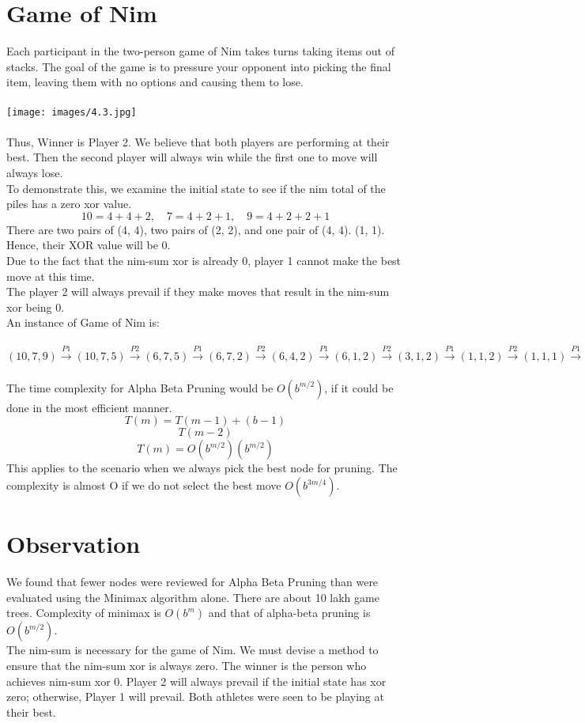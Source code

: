 \documentclass[conference]{IEEEtran}
\begin{document}
\section{Game of Nim}
Each participant in the two-person game of Nim takes turns taking items out of stacks. The goal of the game is to pressure your opponent into picking the final item, leaving them with no options and causing them to lose.\\ \\
\texttt{[image: images/4.3.jpg]} \\ \\
Thus, Winner is Player 2.
We believe that both players are performing at their best. Then the second player will always win while the first one to move will always lose.\\
To demonstrate this, we examine the initial state to see if the nim total of the piles has a zero xor value.\\
$$10 = 4 + 4 + 2, \quad 7 = 4 + 2 + 1, \quad 9 = 4 + 2 + 2 + 1$$
There are two pairs of (4, 4), two pairs of (2, 2), and one pair of (4, 4). (1, 1). Hence, their XOR value will be 0.\\
Due to the fact that the nim-sum xor is already 0, player 1 cannot make the best move at this time.\\
The player 2 will always prevail if they make moves that result in the nim-sum xor being 0.\\
An instance of Game of Nim is: \\ \\
$(10, 7, 9) \xrightarrow{P1} (10, 7, 5) \xrightarrow{P2} (6, 7, 5) \xrightarrow{P1} (6, 7, 2) \xrightarrow{P2} (6, 4, 2) \xrightarrow{P1} (6, 1, 2) \xrightarrow{P2} (3, 1, 2) \xrightarrow{P1} (1, 1, 2) \xrightarrow{P2} (1, 1, 1) \xrightarrow{P1} (0, 1, 1) \xrightarrow{P2} (0, 1, 0) \xrightarrow{P1} (0,0,0)$ \\ \\
The time complexity for Alpha Beta Pruning would be $O(b^{m/2})$, if it could be done in the most efficient manner.\\
$$T(m) = T(m - 1) + (b - 1) $$
$$T(m - 2) $$
$$T(m) = O(b^{m/2} ) (b^{m/2})$$
This applies to the scenario when we always pick the best node for pruning. The complexity is almost O if we do not select the best move $O(b^{3m/4})$.

\section{Observation}
\indent We found that fewer nodes were reviewed for Alpha Beta Pruning than were evaluated using the Minimax algorithm alone. There are about 10 lakh game trees. Complexity of minimax is $O(b^{m})$ and that of alpha-beta pruning is $O(b^{m/2})$.\\
\indent The nim-sum is necessary for the game of Nim. We must devise a method to ensure that the nim-sum xor is always zero. The winner is the person who achieves nim-sum xor 0. Player 2 will always prevail if the initial state has xor zero; otherwise, Player 1 will prevail. Both athletes were seen to be playing at their best. \\
\end{document}
